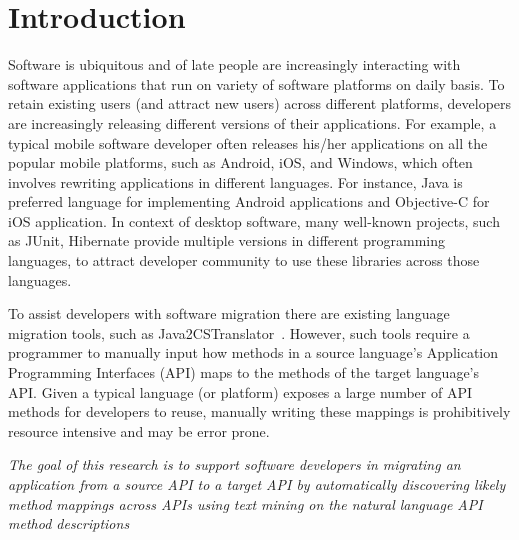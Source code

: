 \section{Introduction}
\label{sec:introduction}


Software is ubiquitous and of late people are increasingly interacting
with software applications
that run on variety of software platforms on daily basis.
To retain existing users (and attract new users) across different platforms,
developers are increasingly releasing different versions of their applications.
For example, a typical mobile software developer often releases his/her applications
on all the popular mobile platforms, such as Android, iOS, and Windows,
which often involves rewriting applications in different languages.
For instance, Java is preferred language for implementing Android applications
and Objective-C for iOS application.
In context of desktop software, many well-known projects, such as JUnit,
Hibernate provide multiple versions in different programming languages,
to attract developer community to use these
libraries across those languages.


To assist developers with software migration
there are existing language migration tools, such as Java2CSTranslator~\cite{java2cstranslator}.
However, such tools require a programmer to manually input
how methods in a source language's Application Programming Interfaces (API) maps to the methods of the target language's API. 
Given a typical language (or platform) exposes a large number of API methods for developers to reuse, manually writing these mappings is prohibitively resource intensive and may be error prone.


\textit{The goal of this research is to support software developers 
in migrating an application from a source API to a target API
by automatically discovering likely method mappings across APIs using text mining
on the natural language API method descriptions}


